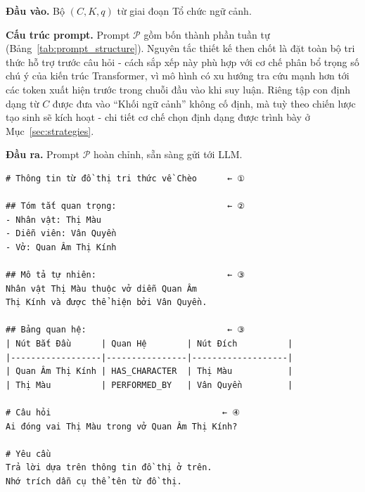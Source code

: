 \textbf{Đầu vào.} Bộ $(C, K, q)$ từ giai đoạn Tổ chức ngữ cảnh.

\textbf{Cấu trúc prompt.} Prompt $\mathcal{P}$ gồm bốn thành phần tuần tự (Bảng~\ref{tab:prompt_structure}). Nguyên tắc thiết kế then chốt là đặt toàn bộ tri thức hỗ trợ trước câu hỏi - cách sắp xếp này phù hợp với cơ chế phân bổ trọng số chú ý của kiến trúc Transformer, vì mô hình có xu hướng tra cứu mạnh hơn tới các token xuất hiện trước trong chuỗi đầu vào khi suy luận. Riêng tập con định dạng từ $C$ được đưa vào ``Khối ngữ cảnh'' không cố định, mà tuỳ theo chiến lược tạo sinh sẽ kích hoạt - chi tiết cơ chế chọn định dạng được trình bày ở Mục~\ref{sec:strategies}.

\begin{table}[ht]
  \centering
  \caption{Các thành phần cấu trúc prompt.}
  \label{tab:prompt_structure}
\end{table}

\textbf{Đầu ra.} Prompt $\mathcal{P}$ hoàn chỉnh, sẵn sàng gửi tới LLM.

\begin{tcolorbox}[colback=gray!5, colframe=black!50, arc=4pt, boxrule=0.5pt, left=4pt, right=4pt, top=4pt, bottom=4pt]
{\small
\begin{verbatim}
# Thông tin từ đồ thị tri thức về Chèo      ← ①

## Tóm tắt quan trọng:                      ← ②
- Nhân vật: Thị Màu
- Diễn viên: Vân Quyền
- Vở: Quan Âm Thị Kính

## Mô tả tự nhiên:                          ← ③
Nhân vật Thị Màu thuộc vở diễn Quan Âm
Thị Kính và được thể hiện bởi Vân Quyền.

## Bảng quan hệ:                            ← ③
| Nút Bắt Đầu      | Quan Hệ        | Nút Đích          |
|------------------|----------------|-------------------|
| Quan Âm Thị Kính | HAS_CHARACTER  | Thị Màu           |
| Thị Màu          | PERFORMED_BY   | Vân Quyền         |

# Câu hỏi                                  ← ④
Ai đóng vai Thị Màu trong vở Quan Âm Thị Kính?

# Yêu cầu
Trả lời dựa trên thông tin đồ thị ở trên.
Nhớ trích dẫn cụ thể tên từ đồ thị.
\end{verbatim}
}
\end{tcolorbox}


